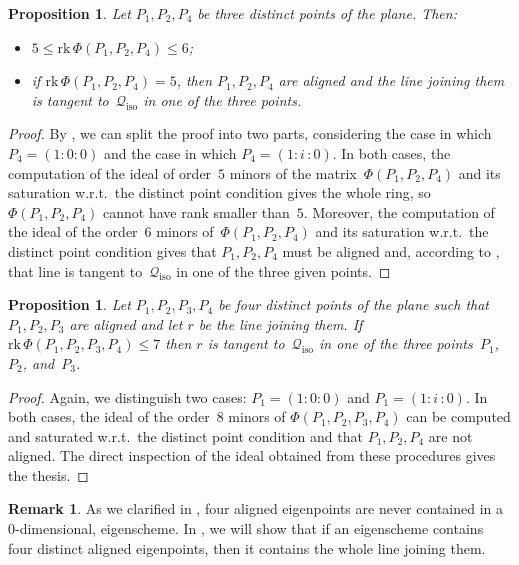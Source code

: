 \documentclass[a4paper, 11pt, reqno]{amsart}
\theoremstyle{plain}
\newtheorem{prop}[lemma]{Proposition}
\theoremstyle{definition}
\newtheorem{rmk}[lemma]{Remark}
\newcommand{\iii}{\textit{i}\,}
\newcommand{\rk}{\ensuremath{\mathrm{rk}}}
\newcommand{\iso}{\mathcal{Q}_{\mathrm{iso}}}
\begin{document}
\begin{prop}
\label{manca il riferimento su ancillary  non e': condition_rank_aligned}
Let $P_1, P_2, P_4$ be three distinct points of the plane. Then:
%
\begin{itemize}
  \item $5 \leq \rk \,\Phi(P_1, P_2, P_4) \leq 6$;
  \item if
  $\rk \, \Phi(P_1, P_2, P_4) = 5$, then $P_1, P_2, P_4$
  are aligned and the line joining them is tangent to~$\iso$
  in one of the three points.
\end{itemize}
%
\end{prop}
\begin{proof}
By , we can split the proof into two parts, considering the case in
which $P_4 = (1: 0: 0)$ and the case in which $P_4 = (1: \iii: 0)$.
In both cases, the computation of the ideal of order~$5$ minors of the matrix~$\Phi(P_1, P_2, P_4)$ and its saturation w.r.t.\ the distinct point condition gives the whole ring,
so $\Phi(P_1, P_2, P_4)$ cannot have rank smaller than~$5$.
Moreover, the computation of the ideal of the order~$6$ minors of~$\Phi(P_1, P_2, P_4)$ and its
saturation w.r.t.\ the distinct point condition gives that
$P_1, P_2, P_4$ must be aligned and, according to ,
that line is tangent to~$\iso$ in one of the three given points.
\end{proof}

\begin{prop}
\label{prop:condition3+1}
Let $P_1, P_2, P_3, P_4$ be four distinct points of the plane such that
$P_1, P_2, P_3$ are aligned and let $r$ be the line joining them.
If $\rk \,\Phi(P_1, P_2, P_3, P_4) \leq 7$ then $r$ is tangent to~$\iso$ in one of the three points~$P_1$,  $P_2$, and~$P_3$.
\end{prop}
\begin{proof}
Again, we distinguish two cases: $P_1 = (1: 0: 0)$ and
$P_1 = (1: \iii: 0)$. In both cases, the ideal of the order~$8$
minors of $\Phi(P_1, P_2, P_3, P_4)$ can be computed and saturated
w.r.t.\ the distinct point condition and that
$P_1, P_2, P_4$ are not aligned.
The direct inspection of the ideal obtained from these procedures gives the thesis.
\end{proof}

\begin{rmk}
As we clarified in , four aligned eigenpoints are never contained in a $0$-dimensional, eigenscheme.
In , we will show that if an eigenscheme contains four distinct aligned eigenpoints, then it contains the whole line joining them.
\end{rmk}
\end{document}
